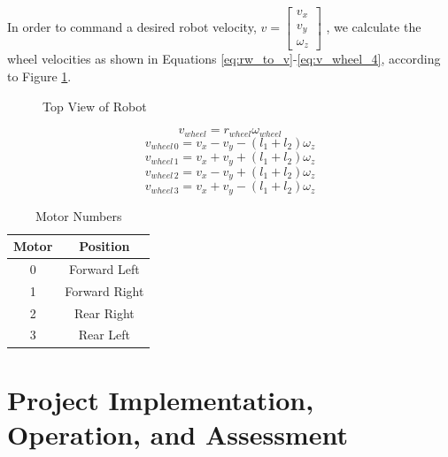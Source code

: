 \documentclass[letterpaper,12pt]{article}
\begin{document}
In order to command a desired robot velocity,
\begin{math}
  v=
  \begin{bmatrix}
    v_x \\
    v_y \\
    \omega_z
  \end{bmatrix}
\end{math}
, we calculate the wheel velocities as shown in Equations \ref{eq:rw_to_v}-\ref{eq:v_wheel_4}, according to Figure \ref{fig:robot_top_view}.

\begin{figure}[h!]
  \centering
  
  \caption{Top View of Robot}
  \label{fig:robot_top_view}
\end{figure}

\begin{equation}
  v_{wheel}=r_{wheel}\omega_{wheel}
  \label{eq:rw_to_v}
\end{equation}
\begin{equation}
  v_{wheel\,0}=v_x-v_y-(l_1+l_2)\omega_z
  \label{eq:v_wheel_1}
\end{equation}
\begin{equation}
  v_{wheel\,1}=v_x+v_y+(l_1+l_2)\omega_z
  \label{eq:v_wheel_2}
\end{equation}
\begin{equation}
  v_{wheel\,2}=v_x-v_y+(l_1+l_2)\omega_z
  \label{eq:v_wheel_3}
\end{equation}
\begin{equation}
  v_{wheel\,3}=v_x+v_y-(l_1+l_2)\omega_z
  \label{eq:v_wheel_4}
\end{equation}

\begin{table}[h!]
  \centering
  \begin{tabular}{| c | c |}
    \hline
    \textbf{Motor} & \textbf{Position} \\
    \hline
    0 & Forward Left \\
    \hline
    1 & Forward Right \\
    \hline
    2 & Rear Right \\
    \hline
    3 & Rear Left \\
    \hline
  \end{tabular}
  \caption{Motor Numbers}
  \label{tab:motor_nums}
\end{table}

\section{Project Implementation, Operation, and Assessment}
\label{sec:implopassess}
\end{document}
